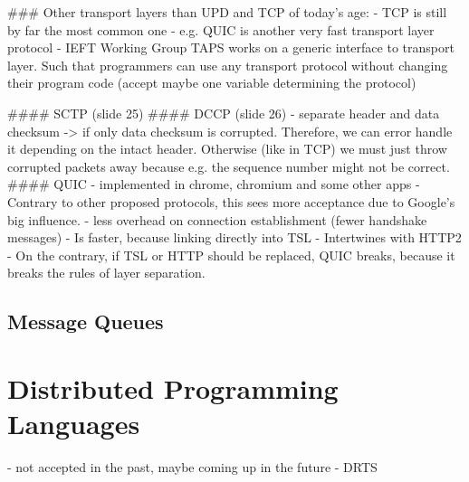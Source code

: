 ### Other transport layers than UPD and TCP of today's age:
- TCP is still by far the most common one
- e.g. QUIC is another very fast transport layer protocol
- IEFT Working Group TAPS works on a generic interface to transport layer. Such that programmers can use any transport protocol without changing their program code (accept maybe one variable determining the protocol)


#### SCTP (slide 25)
#### DCCP (slide 26)
- separate header and data checksum -> if only data checksum is corrupted. Therefore, we can error handle it depending on the intact header. Otherwise (like in TCP) we must just throw corrupted packets away because e.g. the sequence number might not be correct.
#### QUIC
- implemented in chrome, chromium and some other apps
- Contrary to other proposed protocols, this sees more acceptance due to Google's big influence.
- less overhead on connection establishment (fewer handshake messages)
- Is faster, because linking directly into TSL
- Intertwines with HTTP2
- On the contrary, if TSL or HTTP should be replaced, QUIC breaks, because it breaks the rules of layer separation.



\subsection{Message Queues}

\section{Distributed Programming Languages}

- not accepted in the past, maybe coming up in the future
- \ac{DRTS}